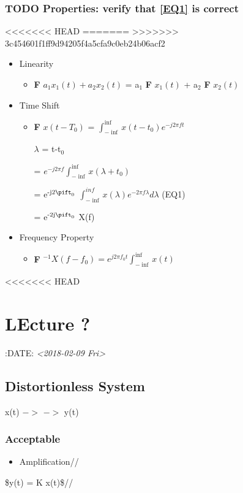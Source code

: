 \documentclass[11pt]{article}
\begin{document}
\subsubsection{{\bfseries\sffamily TODO} Properties: verify that \ref{EQ1} is correct}
<<<<<<< HEAD
\label{sec-1-4-1}
=======
\label{sec-4-4-1}
>>>>>>> 3c454601f1ff9d94205f4a5cfa9c0eb24b06acf2
\begin{itemize}
\item Linearity
\begin{itemize}
\item \textbf{F} ${a_1 x_1(t) + a_2 x_2(t)}$ = a$_{\text{1}}$ \textbf{F} ${x_1(t)}$ + a$_{\text{2}}$ \textbf{F} ${x_2(t)}$
\end{itemize}
\item Time Shift
\begin{itemize}
\item \textbf{F} ${x(t - T_0)}$ = $\int_{-\inf}^{\inf} x(t-t_0) e^{-j2\pi ft}$

$\lambda$ = t-t$_{\text{0}}$

= $e^{-j2\pi f}\int_{-\inf}^{\inf}{x(\lambda +t_0)}$

= e$^{\text{-j2}\pift_{\text{0}}}$ $\int_{-\inf}^{inf} x(\lambda) e^{-2\pi f\lambda} d\lambda$ \label{EQ1} (EQ1)

= e$^{\text{-2j}\pift_{\text{0}}}$ X(f)
\end{itemize}

\item Frequency Property
\begin{itemize}
\item \textbf{F} $^{-1}{X(f-f_0)} = e^{j2\pi f_0t} \int_{-\inf}^{\inf}{x(t)}$
\end{itemize}
\end{itemize}
<<<<<<< HEAD

\section{LEcture ?}
\label{sec-2}
:DATE: \textit{<2018-02-09 Fri>}

\subsection{Distortionless System}
\label{sec-2-1}

x(t) $->$ \box $->$ y(t)

\subsubsection{Acceptable}
\label{sec-2-1-1}
\begin{itemize}
\item Amplification//
\end{itemize}
\$y(t) = K x(t)\$//
\end{document}

